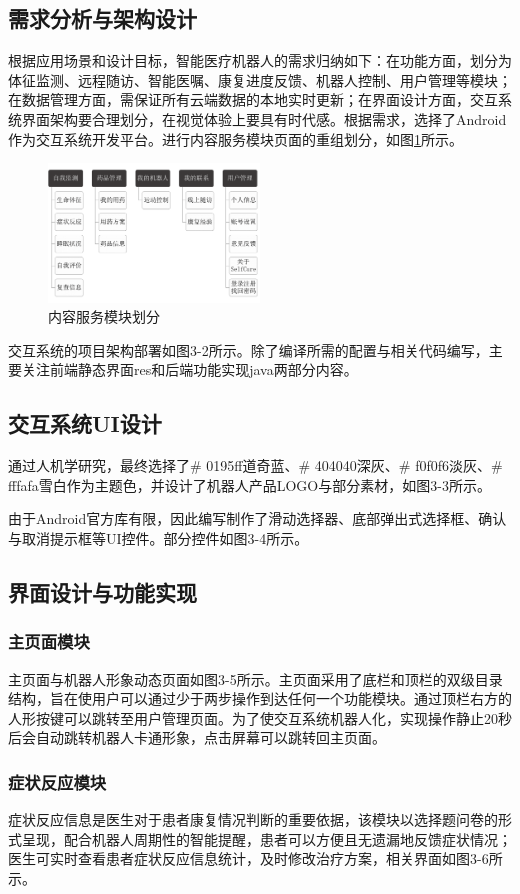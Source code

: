 \documentclass[UTF8,bachelor]{XJTUthesis}
\begin{document}
\subsection{需求分析与架构设计}
根据应用场景和设计目标，智能医疗机器人的需求归纳如下：在功能方面，划分为体征监测、远程随访、智能医嘱、康复进度反馈、机器人控制、用户管理等模块；在数据管理方面，需保证所有云端数据的本地实时更新；在界面设计方面，交互系统界面架构要合理划分，在视觉体验上要具有时代感。根据需求，选择了Android作为交互系统开发平台。进行内容服务模块页面的重组划分，如图\ref{module}所示。
\begin{figure}[htbp]
  \centering
  \includegraphics[width=0.5\textwidth]{example//module.png}
  \caption{内容服务模块划分}\label{module}
\end{figure}
交互系统的项目架构部署如图3-2所示。除了编译所需的配置与相关代码编写，主要关注前端静态界面res和后端功能实现java两部分内容。\par
\subsection{交互系统UI设计}
通过人机学研究，最终选择了\# 0195ff道奇蓝、\# 404040深灰、\# f0f0f6淡灰、\# fffafa雪白作为主题色，并设计了机器人产品LOGO与部分素材，如图3-3所示。\par
由于Android官方库有限，因此编写制作了滑动选择器、底部弹出式选择框、确认与取消提示框等UI控件。部分控件如图3-4所示。

\subsection{界面设计与功能实现}
\subsubsection{主页面模块}
主页面与机器人形象动态页面如图3-5所示。主页面采用了底栏和顶栏的双级目录结构，旨在使用户可以通过少于两步操作到达任何一个功能模块。通过顶栏右方的人形按键可以跳转至用户管理页面。为了使交互系统机器人化，实现操作静止20秒后会自动跳转机器人卡通形象，点击屏幕可以跳转回主页面。
\subsubsection{症状反应模块}
症状反应信息是医生对于患者康复情况判断的重要依据，该模块以选择题问卷的形式呈现，配合机器人周期性的智能提醒，患者可以方便且无遗漏地反馈症状情况；医生可实时查看患者症状反应信息统计，及时修改治疗方案，相关界面如图3-6所示。
\end{document}
